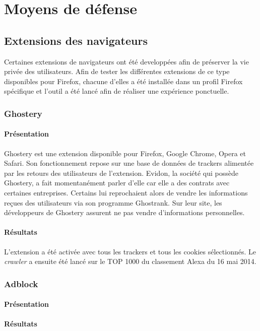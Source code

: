 \chapter{Moyens de défense}
\section{Extensions des navigateurs}
Certaines extensions de navigateurs ont été developpées afin de préserver la vie privée des utilisateurs.
Afin de tester les différentes extensions de ce type disponibles pour Firefox, chacune d'elles a été installée dans un profil Firefox spécifique et l'outil a été lancé afin de réaliser une expérience ponctuelle.

\subsection{Ghostery}
\subsubsection{Présentation}
Ghostery \cite{ghostery_homepage} est une extension disponible pour Firefox, Google Chrome, Opera et Safari. Son fonctionnement repose sur une base de données de trackers alimentée par les retours des utilisateurs de l'extension. Evidon, la société qui possède Ghostery, a fait momentanément parler d'elle car elle a des contrats avec certaines entreprises. Certains lui reprochaient alors de vendre les informations reçues des utilisateurs via son programme Ghostrank. Sur leur site, les développeurs de Ghostery assurent ne pas vendre d'informations personnelles.

\subsubsection{Résultats}
L'extension a été activée avec tous les trackers et tous les cookies sélectionnés. Le \textit{crawler} a ensuite été lancé sur le TOP 1000 du classement Alexa \cite{AlexaTop} du 16 mai 2014.

\subsection{Adblock}
\subsubsection{Présentation}
\subsubsection{Résultats}

